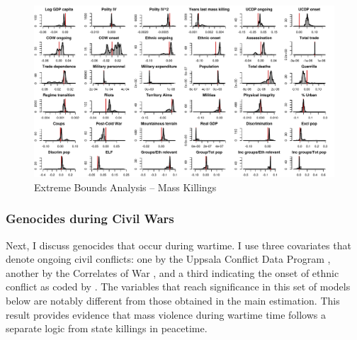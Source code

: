 \clearpage
\begin{figure}
    \centering
    \includegraphics[width=\textwidth]{images/mk.pdf}
    \caption{Extreme Bounds Analysis -- Mass Killings}
    \label{fig:mk}
\end{figure}
\clearpage

\subsubsection{Genocides during Civil Wars}
\label{sec:civil-wars}

Next, I discuss genocides that occur during wartime. I use three covariates that denote ongoing civil conflicts: one by the Uppsala Conflict Data Program \citep{allansson2017organized,gleditsch2002armed}, another by the Correlates of War \citep{sarkees2010resort}, and a third indicating the onset of ethnic conflict as coded by \citet{cederman2010ethnic}. The variables that reach significance in this set of models below are notably different from those obtained in the main estimation. This result provides evidence that mass violence during wartime time follows a separate logic from state killings in peacetime.

\vspace{1cm}

